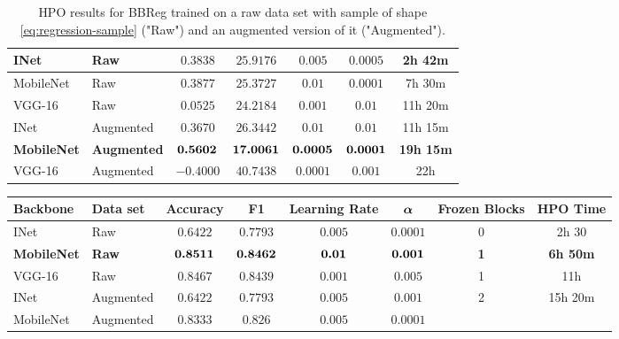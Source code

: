 \begin{landscape}
\begin{table}[!ht]
\begin{tabular}{|l|l|c|c|c|c|c|}
    \hline
        INet & Raw & $0.3838$ & $25.9176$ & $0.005$ & $0.0005$ & 2h 42m\\
    \hline
        MobileNet & Raw & $0.3877$ & $25.3727$ & $0.01$ & $0.0001$ & 7h 30m\\
    \hline
        VGG-16 & Raw & $0.0525$ & $24.2184$ & $0.001$ & $0.01$ & 11h 20m\\
    \hline
    \hline
        INet & Augmented & $0.3670$ & $26.3442$ & $0.01$ & $0.01$ & 11h 15m\\
    \hline
        \textbf{MobileNet}
        & \textbf{Augmented}
        & $\bm{0.5602}$
        & $\bm{17.0061}$
        & $\bm{0.0005}$
        & $\bm{0.0001}$
        & \textbf{19h 15m}\\
    \hline
        VGG-16 & Augmented & $-0.4000$ & $40.7438$ & $0.0001$ & $0.001$ & 22h\\
    \hline
    \end{tabular}
    \caption{HPO results for BBReg trained on a raw data set with sample of shape \eqref{eq:regression-sample} ("Raw") and an augmented version of it ("Augmented").}
    \label{fig:two-stage-regression-results}
\end{table}
\begin{table}[!ht]
    \centering
    \begin{tabular}{|l|l|c|c|c|c|c|c|}
        \hline
         \textbf{Backbone} & \textbf{Data set} &  \textbf{Accuracy} & \textbf{F1} & \textbf{Learning Rate} & $\bm{\alpha}$
         & \textbf{Frozen Blocks} & \textbf{HPO Time}\\
        \hline
        INet &
        Raw &
        $0.6422$ &
        $0.7793$ &
        $0.005$ &
        $0.0001$ &
        0 &
        2h 30
        \\
        \hline
        \textbf{MobileNet} &
        \textbf{Raw} &
        $\bm{0.8511}$ &
        $\bm{0.8462}$ &
        $\bm{0.01}$ &
        $\bm{0.001}$ &
        \textbf{1} &
        \textbf{6h 50m}
        \\
        \hline
        VGG-16 &
        Raw &
        $0.8467$ &
        $0.8439$ &
        $0.001$ &
        $0.005$ &
        1 &
        11h
        \\
        \hline
        \hline
        INet & Augmented & $0.6422$ & $0.7793$
        &
        $0.005$ &
        $0.001$ &
        2 &
        15h 20m\\
        \hline
        MobileNet &
        Augmented &
        $0.8333$ &
        $0.826$ &
        $0.005$ &
        $0.0001$ &

\end{tabular}
\end{table}
\end{landscape}
